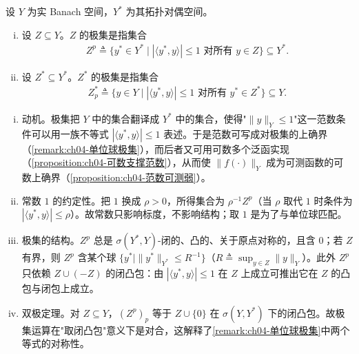 \documentclass[../../main.tex]{subfiles}%
\begin{document}
\begin{definition}[极集]\label{definition:ch04-极集}
设 $Y$ 为实 Banach 空间，$Y^*$ 为其拓扑对偶空间。
\begin{enumerate}[(i)]
\item 设 $Z\subseteq Y$。$Z$ 的极集是指集合
\begin{align*}
Z^p\triangleq \{y^*\in Y^*\mid |\langle y^*,y\rangle|\leqslant1\text{ 对所有 }y\in Z\}\subseteq Y^*.
\end{align*}
\item 设 $Z^*\subseteq Y^*$。$Z^*$ 的极集是指集合
\begin{align*}
Z_p^*\triangleq \{y\in Y\mid |\langle y^*,y\rangle|\leqslant1\text{ 对所有 }y^*\in Z^*\}\subseteq Y.
\end{align*}
\end{enumerate}
\end{definition}

\begin{remark}\label{remark:ch04-极集动机}
\begin{enumerate}[(i)]
\item 动机。极集把 $Y$ 中的集合翻译成 $Y^*$ 中的集合，使得"$\|y\|_Y\leqslant1$"这一范数条件可以用一族不等式 $|\langle y^*,y\rangle|\leqslant1$ 表述。于是范数可写成对极集的上确界（\cref{remark:ch04-单位球极集}），而后者又可用可数多个泛函实现（\cref{proposition:ch04-可数支撑范数}），从而使 $\|f(\cdot)\|_Y$ 成为可测函数的可数上确界（\cref{proposition:ch04-范数可测弱}）。
\item 常数 $1$ 的约定性。把 $1$ 换成 $\rho>0$，所得集合为 $\rho^{-1}Z^p$（当 $\rho$ 取代 $1$ 时条件为 $|\langle y^*,y\rangle|\leqslant\rho$）。故常数只影响标度，不影响结构；取 $1$ 是为了与单位球匹配。
\item 极集的结构。$Z^p$ 总是 $\sigma(Y^*,Y)$-闭的、凸的、关于原点对称的，且含 $0$；若 $Z$ 有界，则 $Z^p$ 含某个球 $\{y^*\mid\|y^*\|_{Y^*}\leqslant R^{-1}\}$（$R\triangleq\sup_{y\in Z}\|y\|_Y$）。此外 $Z^p$ 只依赖 $Z\cup(-Z)$ 的闭凸包：由 $|\langle y^*,y\rangle|\leqslant1$ 在 $Z$ 上成立可推出它在 $Z$ 的凸包与闭包上成立。
\item 双极定理。对 $Z\subseteq Y$，$(Z^p)_p$ 等于 $Z\cup\{0\}$ 在 $\sigma(Y,Y^*)$ 下的闭凸包。故极集运算在"取闭凸包"意义下是对合，这解释了\cref{remark:ch04-单位球极集}中两个等式的对称性。
\end{enumerate}
\end{remark}
\end{document}
